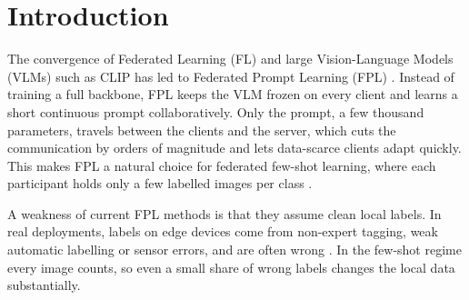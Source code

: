 \documentclass[runningheads]{llncs}
\begin{document}
\section{Introduction}
The convergence of Federated Learning (FL) \cite{mcmahan2017communication} and large Vision-Language
Models (VLMs) such as CLIP \cite{radford2021learning} has led to Federated Prompt Learning (FPL)
\cite{guo2023promptfl}. Instead of training a full backbone, FPL keeps the VLM frozen on every client
and learns a short continuous prompt collaboratively. Only the prompt, a few thousand parameters,
travels between the clients and the server, which cuts the communication by orders of magnitude and
lets data-scarce clients adapt quickly. This makes FPL a natural choice for federated few-shot
learning, where each participant holds only a few labelled images per class \cite{zhou2022learning}.

A weakness of current FPL methods is that they assume clean local labels. In real deployments, labels
on edge devices come from non-expert tagging, weak automatic labelling or sensor errors, and are often
wrong \cite{tsouvalas2022federated}. In the few-shot regime every image counts, so even a small share of
wrong labels changes the local data substantially.


\end{document}
